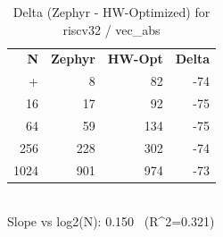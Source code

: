 \begin{table}[tb]
    \centering
    \caption{Delta (Zephyr - HW-Optimized) for riscv32 / vec_abs}
    \label{tab:delta_riscv32_vec_abs}
    \scriptsize
    \begin{tabular}{r r r r}
        \hline
        \textbf{N} & \textbf{Zephyr} & \textbf{HW-Opt} & \textbf{Delta} \\\n+        \hline
        4 & 8 & 82 & -74\\
        16 & 17 & 92 & -75\\
        64 & 59 & 134 & -75\\
        256 & 228 & 302 & -74\\
        1024 & 901 & 974 & -73\\
        \hline
    \end{tabular}
    \vspace{2mm}\\\n    Slope vs log2(N): 0.150 \ (R^2=0.321)\n\end{table}
